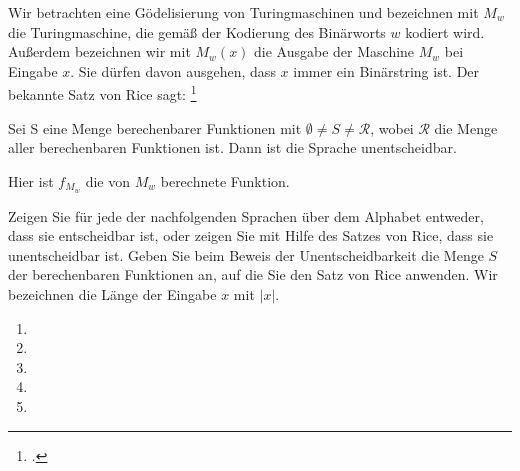 \documentclass{bschlangaul-aufgabe}
\begin{document}

Wir betrachten eine Gödelisierung von Turingmaschinen und bezeichnen mit
$M_w$ die Turingmaschine, die gemäß der Kodierung des Binärworts $w$
kodiert wird. Außerdem bezeichnen wir mit $M_w(x)$ die Ausgabe der
Maschine $M_w$ bei Eingabe $x$. Sie dürfen davon ausgehen, dass $x$
immer ein Binärstring ist. Der bekannte Satz von Rice sagt:
\footcite{examen:66115:2021:03}

Sei S eine Menge berechenbarer Funktionen mit $\emptyset \neq S \neq
\mathcal{R}$, wobei $\mathcal{R}$ die Menge aller berechenbaren
Funktionen ist. Dann ist die Sprache 
unentscheidbar.

Hier ist $f_{M_w}$ die von $M_w$ berechnete Funktion.

Zeigen Sie für jede der nachfolgenden Sprachen über dem Alphabet
 entweder, dass sie entscheidbar ist, oder zeigen Sie mit
Hilfe des Satzes von Rice, dass sie unentscheidbar ist. Geben Sie beim
Beweis der Unentscheidbarkeit die Menge $S$ der berechenbaren Funktionen
an, auf die Sie den Satz von Rice anwenden. Wir bezeichnen die Länge der
Eingabe $x$ mit $|x|$.

\begin{enumerate}


\item {}


\item {}


\item {}


\item {}


\item {}

\end{enumerate}
\end{document}
